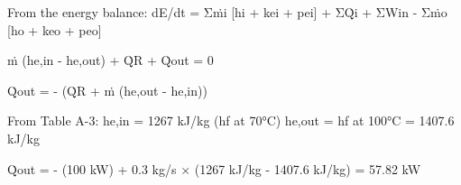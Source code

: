 From the energy balance:  
dE/dt = Σṁi [hi + kei + pei] + ΣQ̇i + ΣWin - Σṁo [ho + keo + peo]  

ṁ (he,in - he,out) + Q̇R + Q̇out = 0  

Q̇out = - (Q̇R + ṁ (he,out - he,in))  

From Table A-3:  
he,in = 1267 kJ/kg (hf at 70°C)  
he,out = hf at 100°C = 1407.6 kJ/kg  

Q̇out = - (100 kW) + 0.3 kg/s × (1267 kJ/kg - 1407.6 kJ/kg)  
= 57.82 kW